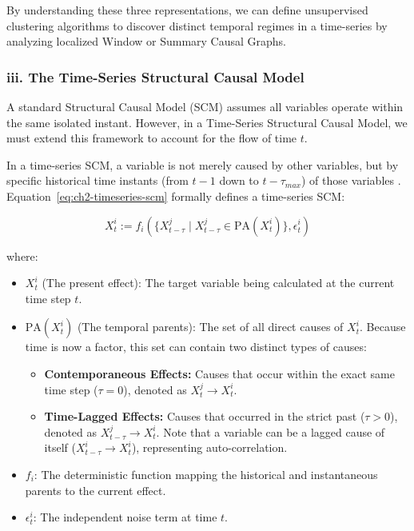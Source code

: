By understanding these three representations, we can define unsupervised clustering algorithms to discover distinct temporal regimes in a time-series by analyzing localized Window or Summary Causal Graphs.

\subsubsection*{iii. The Time-Series Structural Causal Model}

A standard Structural Causal Model (SCM) assumes all variables operate within the same isolated instant. However, in a Time-Series Structural Causal Model, we must extend this framework to account for the flow of time $t$.

In a time-series SCM, a variable is not merely caused by other variables, but by specific historical time instants (from $t-1$ down to $t - \tau_{max}$) of those variables \cite{assaad2022survey}. Equation~\eqref{eq:ch2-timeseries-scm} formally defines a time-series SCM:

\begin{equation}
    \label{eq:ch2-timeseries-scm}
    X_t^i := f_i( \{ X_{t-\tau}^j \mid X_{t-\tau}^j \in \text{PA}(X_t^i) \}, \epsilon_t^i )
\end{equation}

where:
\begin{itemize}
    \item $X_t^i$ (The present effect): The target variable being calculated at the current time step $t$.
    \item $\text{PA}(X_t^i)$ (The temporal parents): The set of all direct causes of $X_t^i$. Because time is now a factor, this set can contain two distinct types of causes:
    \begin{itemize}
        \item \textbf{Contemporaneous Effects:} Causes that occur within the exact same time step ($\tau = 0$), denoted as $X_t^j \rightarrow X_t^i$.
        \item \textbf{Time-Lagged Effects:} Causes that occurred in the strict past ($\tau > 0$), denoted as $X_{t-\tau}^j \rightarrow X_t^i$. Note that a variable can be a lagged cause of itself ($X_{t-\tau}^i \rightarrow X_t^i$), representing auto-correlation.
    \end{itemize}
    \item $f_i$: The deterministic function mapping the historical and instantaneous parents to the current effect.
    \item $\epsilon_t^i$: The independent noise term at time $t$.
\end{itemize}

